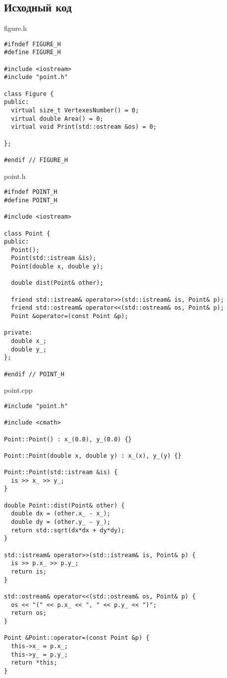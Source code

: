 \documentclass[12pt]{article}
\begin{document}
\vfill

\subsection*{Исходный код}

{\Huge figure.h}
\begin{verbatim}
#ifndef FIGURE_H
#define FIGURE_H

#include <iostream>
#include "point.h"

class Figure {
public:
  virtual size_t VertexesNumber() = 0;
  virtual double Area() = 0;
  virtual void Print(std::ostream &os) = 0;

};

#endif // FIGURE_H

\end{verbatim}
    \pagebreak

\begin{flushleft}
{\Huge point.h}
\begin{verbatim}
#ifndef POINT_H
#define POINT_H

#include <iostream>

class Point {
public:
  Point();
  Point(std::istream &is);
  Point(double x, double y);

  double dist(Point& other);
  
  friend std::istream& operator>>(std::istream& is, Point& p);
  friend std::ostream& operator<<(std::ostream& os, Point& p);
  Point &operator=(const Point &p);

private:
  double x_;
  double y_;
};

#endif // POINT_H

\end{verbatim}
\end{flushleft}
    \pagebreak

\begin{flushleft}
{\Huge point.cpp}
\begin{verbatim}
#include "point.h"

#include <cmath>

Point::Point() : x_(0.0), y_(0.0) {}

Point::Point(double x, double y) : x_(x), y_(y) {}

Point::Point(std::istream &is) {
  is >> x_ >> y_;
}

double Point::dist(Point& other) {
  double dx = (other.x_ - x_);
  double dy = (other.y_ - y_);
  return std::sqrt(dx*dx + dy*dy);
}

std::istream& operator>>(std::istream& is, Point& p) {
  is >> p.x_ >> p.y_;
  return is;
}

std::ostream& operator<<(std::ostream& os, Point& p) {
  os << "(" << p.x_ << ", " << p.y_ << ")";
  return os;
}

Point &Point::operator=(const Point &p) {
  this->x_ = p.x_;
  this->y_ = p.y_;
  return *this;
}
\end{verbatim}
\end{flushleft}
    \pagebreak
\end{document}
